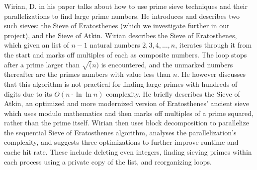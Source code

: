 \documentclass[11pt]{article}
\begin{document}
Wirian, D. in his paper talks about how to use prime sieve techniques and their parallelizations to find 
large prime numbers. He introduces and describes two such sieves: the Sieve of Eratosthenes 
(which we investigate further in our project), and the Sieve of Atkin. Wirian
describes the Sieve of Eratosthenes, which given an list of $n-1$ natural
numbers $2, 3, 4, \ldots, n$, iterates through it from the start and marks
off multiples of each as composite numbers. The loop stops after a prime larger than
$\sqrt(n)$ is encountered, and the unmarked numbers thereafter are the primes 
numbers with value less than $n$. He however discusses that this algorithm is
not practical for finding large primes with hundreds of digits due to its
$O(n \cdot \ln  \ln n)$ complexity.  He briefly describes the Sieve of Atkin,
an optimized and more modernized version of Eratosthenes’ ancient sieve which
uses modulo mathematics and then marks off multiples of a prime squared, 
rather than the prime itself. Wirian then uses block decomposition to parallelize 
the sequential Sieve of Eratosthenes algorithm, analyses the parallelization’s 
complexity, and suggests three optimizations to further improve runtime and 
cache hit rate. These include deleting even integers, finding sieving primes
within each process using a private copy of the list, and reorganizing loops.
\end{document}
